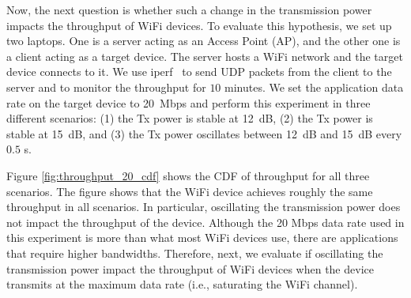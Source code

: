 Now, the next question is whether such a change in the transmission power impacts the throughput of WiFi devices. 
To evaluate this hypothesis, we set up two laptops. One is a server acting as an Access Point (AP), and the other one is a client acting as a target device. The server hosts a WiFi network and the target device connects to it. We use iperf~\cite{iperf} to send UDP packets from the client to the server and to monitor the throughput for $10$ minutes. We set the application data rate on the target device to 20~Mbps and perform this experiment in three different scenarios: (1) the Tx power is stable at 12~dB, (2) the Tx power is stable at 15~dB, and (3) the Tx power oscillates between 12~dB and 15~dB every $0.5$ s.


    

Figure \ref{fig:throughput_20_cdf} shows the CDF of throughput for all three scenarios. The figure shows that the WiFi device achieves roughly the same throughput in all scenarios. In particular, oscillating the transmission power does not impact the throughput of the device.  Although the 20 Mbps data rate used in this experiment is more than what most WiFi devices use, there are applications that require higher bandwidths. Therefore, next, we evaluate if oscillating the transmission power impact the throughput of WiFi devices when the device transmits at the maximum data rate (i.e., saturating the WiFi channel). 


